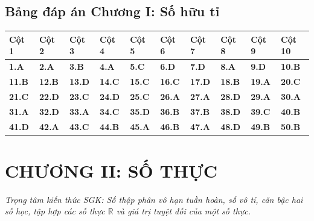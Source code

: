\documentclass[11pt,a4paper]{article}
\begin{document}
\subsection*{\color{primary} Bảng đáp án Chương I: Số hữu tỉ}
\begin{center}
\renewcommand{\arraystretch}{1.25}
\begin{tabularx}{\textwidth}{*{10}{>{\centering\arraybackslash}X}}
\toprule
\textbf{\color{primary} Cột 1} & \textbf{\color{primary} Cột 2} & \textbf{\color{primary} Cột 3} & \textbf{\color{primary} Cột 4} & \textbf{\color{primary} Cột 5} & \textbf{\color{primary} Cột 6} & \textbf{\color{primary} Cột 7} & \textbf{\color{primary} Cột 8} & \textbf{\color{primary} Cột 9} & \textbf{\color{primary} Cột 10} \\
\midrule
\textbf{1.A} & \textbf{2.A} & \textbf{3.B} & \textbf{4.A} & \textbf{5.C} & \textbf{6.D} & \textbf{7.D} & \textbf{8.A} & \textbf{9.D} & \textbf{10.B} \\
\rowcolor{rowtint} \textbf{11.B} & \textbf{12.B} & \textbf{13.D} & \textbf{14.C} & \textbf{15.C} & \textbf{16.C} & \textbf{17.D} & \textbf{18.B} & \textbf{19.A} & \textbf{20.C} \\
\textbf{21.C} & \textbf{22.D} & \textbf{23.C} & \textbf{24.D} & \textbf{25.C} & \textbf{26.A} & \textbf{27.A} & \textbf{28.D} & \textbf{29.A} & \textbf{30.A} \\
\rowcolor{rowtint} \textbf{31.A} & \textbf{32.D} & \textbf{33.A} & \textbf{34.C} & \textbf{35.D} & \textbf{36.B} & \textbf{37.B} & \textbf{38.D} & \textbf{39.C} & \textbf{40.B} \\
\textbf{41.D} & \textbf{42.A} & \textbf{43.C} & \textbf{44.B} & \textbf{45.A} & \textbf{46.B} & \textbf{47.A} & \textbf{48.D} & \textbf{49.B} & \textbf{50.B} \\
\bottomrule
\end{tabularx}
\end{center}\vspace{10pt}
\section*{\color{primary} CHƯƠNG II: SỐ THỰC}
\textit{Trọng tâm kiến thức SGK: Số thập phân vô hạn tuần hoàn, số vô tỉ, căn bậc hai số học, tập hợp các số thực $\mathbb{R}$ và giá trị tuyệt đối của một số thực.}\par\vspace{4pt}
\end{document}
